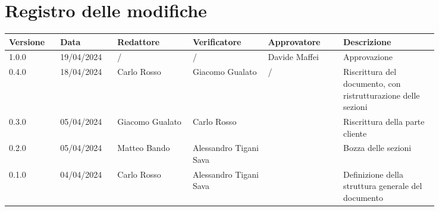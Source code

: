 \section*{Registro delle modifiche}
 {
  \scriptsize
  \begin{tabular}{p{0.10\linewidth}p{0.10\linewidth}p{0.15\linewidth}p{0.15\linewidth}p{0.15\linewidth}p{0.19\linewidth}}
	  \textbf{Versione} & \textbf{Data} & \textbf{Redattore}     & \textbf{Verificatore} & \textbf{Approvatore} & \textbf{Descrizione}                                                                                             \\
	  \toprule
	  1.0.0             & 19/04/2024    & /	& / & Davide Maffei & Approvazione \\
	  \hline
	  0.4.0             & 18/04/2024    & Carlo Rosso	& Giacomo Gualato & / & Riscrittura del documento, con ristrutturazione delle sezioni \\
	  \hline
	  0.3.0             & 05/04/2024    & Giacomo Gualato & Carlo Rosso						&					& Riscrittura della parte cliente \\
	  \hline
	  0.2.0             & 05/04/2024    & Matteo Bando & Alessandro Tigani Sava				&               	& Bozza delle sezioni \\ 
	  \hline
	  0.1.0             & 04/04/2024    & Carlo Rosso & Alessandro Tigani Sava              &               	& Definizione della struttura generale del documento \\
	\hline
	\end{tabular}
 }
